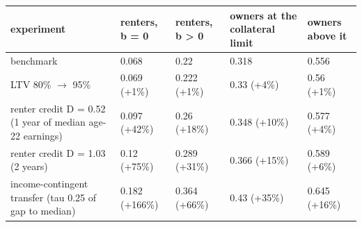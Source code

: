 \begingroup\small
\setlength{\tabcolsep}{3pt}
\renewcommand{\arraystretch}{1.04}
\begin{tabularx}{\linewidth}{XXXXX}
\toprule
experiment & renters, b = 0 & renters, b \textgreater{} 0 & owners at the collateral limit & owners above it \\
\midrule
benchmark & 0.068 & 0.22 & 0.318 & 0.556 \\
LTV 80\% $\to$ 95\% & 0.069 (+1\%) & 0.222 (+1\%) & 0.33 (+4\%) & 0.56 (+1\%) \\
renter credit D = 0.52 (1 year of median age-22 earnings) & 0.097 (+42\%) & 0.26 (+18\%) & 0.348 (+10\%) & 0.577 (+4\%) \\
renter credit D = 1.03 (2 years) & 0.12 (+75\%) & 0.289 (+31\%) & 0.366 (+15\%) & 0.589 (+6\%) \\
income-contingent transfer (tau 0.25 of gap to median) & 0.182 (+166\%) & 0.364 (+66\%) & 0.43 (+35\%) & 0.645 (+16\%) \\
\bottomrule
\end{tabularx}
\endgroup
